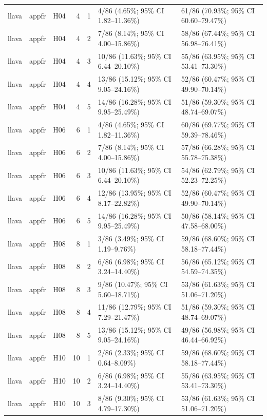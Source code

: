 \begin{longtable}{lllrrll}
llava & appfr & H04 & 4 & 1 & 4/86 (4.65\%; 95\% CI 1.82–11.36\%) & 61/86 (70.93\%; 95\% CI 60.60–79.47\%) \\
llava & appfr & H04 & 4 & 2 & 7/86 (8.14\%; 95\% CI 4.00–15.86\%) & 58/86 (67.44\%; 95\% CI 56.98–76.41\%) \\
llava & appfr & H04 & 4 & 3 & 10/86 (11.63\%; 95\% CI 6.44–20.10\%) & 55/86 (63.95\%; 95\% CI 53.41–73.30\%) \\
llava & appfr & H04 & 4 & 4 & 13/86 (15.12\%; 95\% CI 9.05–24.16\%) & 52/86 (60.47\%; 95\% CI 49.90–70.14\%) \\
llava & appfr & H04 & 4 & 5 & 14/86 (16.28\%; 95\% CI 9.95–25.49\%) & 51/86 (59.30\%; 95\% CI 48.74–69.07\%) \\
llava & appfr & H06 & 6 & 1 & 4/86 (4.65\%; 95\% CI 1.82–11.36\%) & 60/86 (69.77\%; 95\% CI 59.39–78.46\%) \\
llava & appfr & H06 & 6 & 2 & 7/86 (8.14\%; 95\% CI 4.00–15.86\%) & 57/86 (66.28\%; 95\% CI 55.78–75.38\%) \\
llava & appfr & H06 & 6 & 3 & 10/86 (11.63\%; 95\% CI 6.44–20.10\%) & 54/86 (62.79\%; 95\% CI 52.23–72.25\%) \\
llava & appfr & H06 & 6 & 4 & 12/86 (13.95\%; 95\% CI 8.17–22.82\%) & 52/86 (60.47\%; 95\% CI 49.90–70.14\%) \\
llava & appfr & H06 & 6 & 5 & 14/86 (16.28\%; 95\% CI 9.95–25.49\%) & 50/86 (58.14\%; 95\% CI 47.58–68.00\%) \\
llava & appfr & H08 & 8 & 1 & 3/86 (3.49\%; 95\% CI 1.19–9.76\%) & 59/86 (68.60\%; 95\% CI 58.18–77.44\%) \\
llava & appfr & H08 & 8 & 2 & 6/86 (6.98\%; 95\% CI 3.24–14.40\%) & 56/86 (65.12\%; 95\% CI 54.59–74.35\%) \\
llava & appfr & H08 & 8 & 3 & 9/86 (10.47\%; 95\% CI 5.60–18.71\%) & 53/86 (61.63\%; 95\% CI 51.06–71.20\%) \\
llava & appfr & H08 & 8 & 4 & 11/86 (12.79\%; 95\% CI 7.29–21.47\%) & 51/86 (59.30\%; 95\% CI 48.74–69.07\%) \\
llava & appfr & H08 & 8 & 5 & 13/86 (15.12\%; 95\% CI 9.05–24.16\%) & 49/86 (56.98\%; 95\% CI 46.44–66.92\%) \\
llava & appfr & H10 & 10 & 1 & 2/86 (2.33\%; 95\% CI 0.64–8.09\%) & 59/86 (68.60\%; 95\% CI 58.18–77.44\%) \\
llava & appfr & H10 & 10 & 2 & 6/86 (6.98\%; 95\% CI 3.24–14.40\%) & 55/86 (63.95\%; 95\% CI 53.41–73.30\%) \\
llava & appfr & H10 & 10 & 3 & 8/86 (9.30\%; 95\% CI 4.79–17.30\%) & 53/86 (61.63\%; 95\% CI 51.06–71.20\%) \\

\end{longtable}
